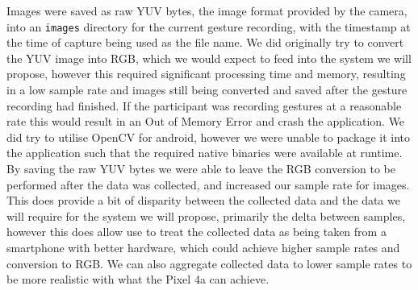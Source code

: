 Images were saved as raw YUV bytes, the image format provided by the camera, into an \verb|images| directory for the current gesture recording, with the timestamp at the time of capture being used as the file name.
We did originally try to convert the YUV image into RGB, which we would expect to feed into the system we will propose, however this required significant processing time and memory, resulting in a low sample rate and images still being converted and saved after the gesture recording had finished. If the participant was recording gestures at a reasonable rate this would result in an Out of Memory Error and crash the application.
We did try to utilise OpenCV for android, however we were unable to package it into the application such that the required native binaries were available at runtime.
By saving the raw YUV bytes we were able to leave the RGB conversion to be performed after the data was collected, and increased our sample rate for images. This does provide a bit of disparity between the collected data and the data we will require for the system we will propose, primarily the delta between samples, however this does allow use to treat the collected data as being taken from a smartphone with better hardware, which could achieve higher sample rates and conversion to RGB. We can also aggregate collected data to lower sample rates to be more realistic with what the Pixel 4a can achieve.

